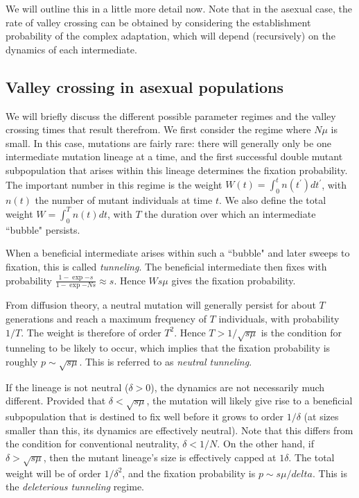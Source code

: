 \documentclass[10pt]{revtex4}
\begin{document}
We will outline this in a little more detail now.
Note that in the asexual case, the rate of valley crossing can be obtained by considering the establishment probability of the complex adaptation, which will depend (recursively) on the dynamics of each intermediate.

\subsection{Valley crossing in asexual populations}

We will briefly discuss the different possible parameter regimes and the valley crossing times that result therefrom.
We first consider the regime where $N\mu$ is small.
In this case, mutations are fairly rare: there will generally only be one intermediate mutation lineage at a time, and the first successful double mutant subpopulation that arises within this lineage determines the fixation probability.
The important number in this regime is the weight $W(t) = \int_0^t n(t^\prime) dt^\prime$, with $n(t)$ the number of mutant individuals at time $t$.
We also define the total weight $W = \int_0^T n(t)dt$, with $T$ the duration over which an intermediate ``bubble" persists.

When a beneficial intermediate arises within such a ``bubble" and later sweeps to fixation, this is called \emph{tunneling}. The beneficial intermediate then fixes with probability $\frac{1-\exp{-s}}{1-\exp{-Ns}} \approx s$. Hence $Ws\mu$ gives the fixation probability.

From diffusion theory, a neutral mutation will generally persist for about $T$ generations and reach a maximum frequency of $T$ individuals, with probability $1/T$.
The weight is therefore of order $T^2$.
Hence $T > 1/\sqrt{s\mu}$ is the condition for tunneling to be likely to occur, which implies that the fixation probability is roughly $p \sim \sqrt{s\mu}$. This is referred to as \emph{neutral tunneling}.

If the lineage is not neutral ($\delta > 0$), the dynamics are not necessarily much different.
Provided that $\delta < \sqrt{s\mu}$, the mutation will likely give rise to a beneficial subpopulation that is destined to fix well before it grows to order $1/\delta$ (at sizes smaller than this, its dynamics are effectively neutral).
Note that this differs from the condition for conventional neutrality, $\delta < 1/N$.
On the other hand, if $\delta > \sqrt{s\mu}$, then the mutant lineage's size is effectively capped at $1\delta$.
The total weight will be of order $1/\delta^2$, and the fixation probability is $p \sim s\mu/delta$. This is the \emph{deleterious tunneling} regime.
\end{document}
